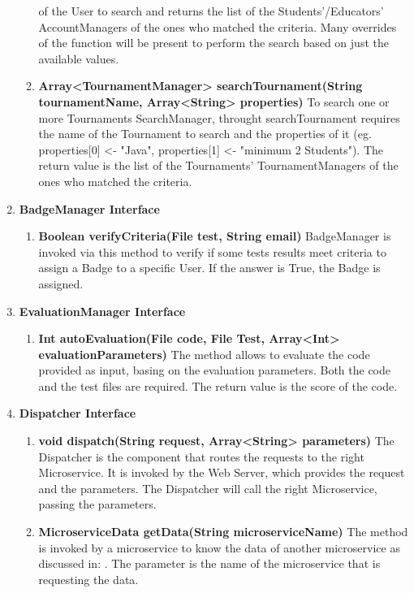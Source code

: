 \begin{enumerate}
\begin{enumerate}[label=$\bullet$]
            of the User to search and returns the list of the Students'/Educators' AccountManagers of the ones who matched the criteria. Many overrides of the function will be present to perform the search based on just the available values.
            \item \textbf{Array<TournamentManager> searchTournament(String tournamentName, Array<String> properties)} To search one or more Tournaments SearchManager, throught searchTournament requires the name of the Tournament 
            to search and the properties of it (eg. properties[0] <- "Java", properties[1] <- "minimum 2 Students"). The return value is the list of the Tournaments' TournamentManagers of the ones who matched the criteria.
        \end{enumerate}
    \item \textbf{BadgeManager Interface}
        \begin{enumerate}[label=$\bullet$]
            \item \textbf{Boolean verifyCriteria(File test, String email)} BadgeManager is invoked via this method to verify if some tests results meet criteria to assign a Badge to a specific User. If the answer is True, the Badge
            is assigned.
        \end{enumerate}
    \item \textbf{EvaluationManager Interface}
        \begin{enumerate}[label=$\bullet$]
            \item \textbf{Int autoEvaluation(File code, File Test, Array<Int> evaluationParameters)} The method allows to evaluate the code provided as input, basing on the evaluation parameters. Both the code and the test files are
            required. The return value is the score of the code.
        \end{enumerate}
    \item \textbf{Dispatcher Interface}
        \begin{enumerate}[label=$\bullet$]
            \item \textbf{void dispatch(String request, Array<String> parameters)} The Dispatcher is the component that routes the requests to the right Microservice. It is invoked by the Web Server, which provides the request and the 
            parameters. The Dispatcher will call the right Microservice, passing the parameters.
            \item \textbf{MicroserviceData getData(String microserviceName)} \label{meth:dispGetData}The method is invoked by a microservice to know the data of another microservice as discussed in: . The parameter is the name of the microservice that is requesting the data.

\end{enumerate}
\end{enumerate}
